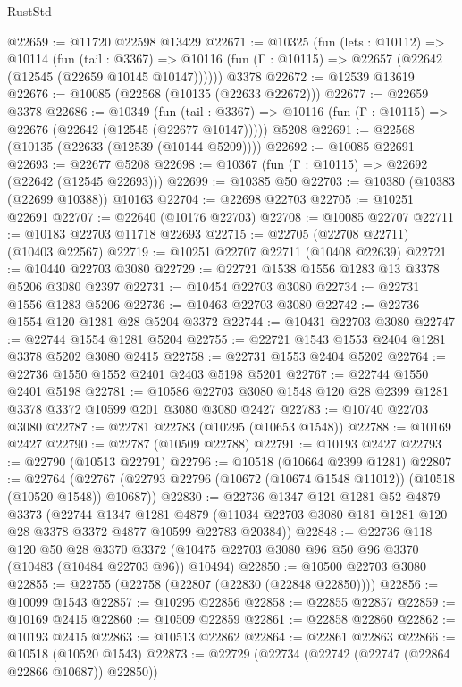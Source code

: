 \begin{lexlean}{RustStd}
\begin{coremodule}
@22659 := @11720 @22598 @13429
@22671 := @10325
    (fun (lets : @10112) =>
    @10114
      (fun (tail : @3367) =>
      @10116 (fun (Γ : @10115) => @22657 (@22642 (@12545 (@22659 @10145 @10147))))))
    @3378
@22672 := @12539 @13619
@22676 := @10085 (@22568 (@10135 (@22633 @22672)))
@22677 := @22659 @3378
@22686 := @10349
    (fun (tail : @3367) => @10116 (fun (Γ : @10115) => @22676 (@22642 (@12545 (@22677 @10147)))))
    @5208
@22691 := @22568 (@10135 (@22633 (@12539 (@10144 @5209))))
@22692 := @10085 @22691
@22693 := @22677 @5208
@22698 := @10367 (fun (Γ : @10115) => @22692 (@22642 (@12545 @22693)))
@22699 := @10385 @50
@22703 := @10380 (@10383 (@22699 @10388)) @10163
@22704 := @22698 @22703
@22705 := @10251 @22691
@22707 := @22640 (@10176 @22703)
@22708 := @10085 @22707
@22711 := @10183 @22703 @11718 @22693
@22715 := @22705 (@22708 @22711) (@10403 @22567)
@22719 := @10251 @22707 @22711 (@10408 @22639)
@22721 := @10440 @22703 @3080
@22729 := @22721 @1538 @1556 @1283 @13 @3378 @5206 @3080 @2397
@22731 := @10454 @22703 @3080
@22734 := @22731 @1556 @1283 @5206
@22736 := @10463 @22703 @3080
@22742 := @22736 @1554 @120 @1281 @28 @5204 @3372
@22744 := @10431 @22703 @3080
@22747 := @22744 @1554 @1281 @5204
@22755 := @22721 @1543 @1553 @2404 @1281 @3378 @5202 @3080 @2415
@22758 := @22731 @1553 @2404 @5202
@22764 := @22736 @1550 @1552 @2401 @2403 @5198 @5201
@22767 := @22744 @1550 @2401 @5198
@22781 := @10586 @22703 @3080 @1548 @120 @28 @2399 @1281 @3378 @3372 @10599 @201 @3080 @3080 @2427
@22783 := @10740 @22703 @3080
@22787 := @22781 @22783 (@10295 (@10653 @1548))
@22788 := @10169 @2427
@22790 := @22787 (@10509 @22788)
@22791 := @10193 @2427
@22793 := @22790 (@10513 @22791)
@22796 := @10518 (@10664 @2399 @1281)
@22807 := @22764
    (@22767 (@22793 @22796 (@10672 (@10674 @1548 @11012)) (@10518 (@10520 @1548)) @10687))
@22830 := @22736
    @1347
    @121
    @1281
    @52
    @4879
    @3373
    (@22744
      @1347
      @1281
      @4879
      (@11034 @22703 @3080 @181 @1281 @120 @28 @3378 @3372 @4877 @10599 @22783 @20384))
@22848 := @22736
    @118
    @120
    @50
    @28
    @3370
    @3372
    (@10475 @22703 @3080 @96 @50 @96 @3370 (@10483 (@10484 @22703 @96)) @10494)
@22850 := @10500 @22703 @3080
@22855 := @22755 (@22758 (@22807 (@22830 (@22848 @22850))))
@22856 := @10099 @1543
@22857 := @10295 @22856
@22858 := @22855 @22857
@22859 := @10169 @2415
@22860 := @10509 @22859
@22861 := @22858 @22860
@22862 := @10193 @2415
@22863 := @10513 @22862
@22864 := @22861 @22863
@22866 := @10518 (@10520 @1543)
@22873 := @22729 (@22734 (@22742 (@22747 (@22864 @22866 @10687)) @22850))

\end{coremodule}
\end{lexlean}
